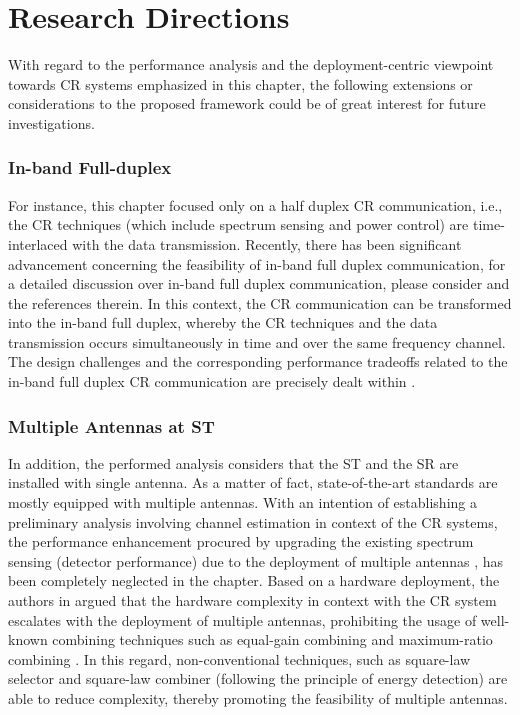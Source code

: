 {\section{Research Directions}
\label{sec:RD}
With regard to the performance analysis and the deployment-centric viewpoint towards CR systems emphasized in this chapter, the following extensions or considerations to the proposed framework could be of great interest for future investigations. 


\subsubsection*{In-band Full-duplex}
For instance, this chapter focused only on a half duplex CR communication, i.e., the CR techniques (which include spectrum sensing and power control) are time-interlaced with the data transmission. Recently, there has been significant advancement concerning the feasibility of in-band full duplex communication, for a detailed discussion over in-band full duplex communication, please consider \cite{Sab14, Liu15} and the references therein. In this context, the CR communication can be transformed into the in-band full duplex, whereby the CR techniques and the data transmission occurs simultaneously in time and over the same frequency channel. The design challenges and the corresponding performance tradeoffs related to the in-band full duplex CR communication are precisely dealt within \cite{Liao15, Kim15}.

\subsubsection*{Multiple Antennas at ST}
In addition, the performed analysis considers that the ST and the SR are installed with single antenna. As a matter of fact, state-of-the-art standards are mostly equipped with multiple antennas. With an intention of establishing a preliminary analysis involving channel estimation in context of the CR systems, the performance enhancement procured by upgrading the existing spectrum sensing (detector performance) due to the deployment of multiple antennas \cite{Dig07,Tah10}, has been completely neglected in the chapter. Based on a hardware deployment, the authors in \cite{Kaushik16_VTC2} argued that the hardware complexity in context with the CR system escalates with the deployment of multiple antennas, prohibiting the usage of well-known combining techniques such as equal-gain combining and maximum-ratio combining \cite{Alouini03}. In this regard, non-conventional techniques, such as square-law selector and square-law combiner (following the principle of energy detection) are able to reduce complexity, thereby promoting the feasibility of multiple antennas.

}

